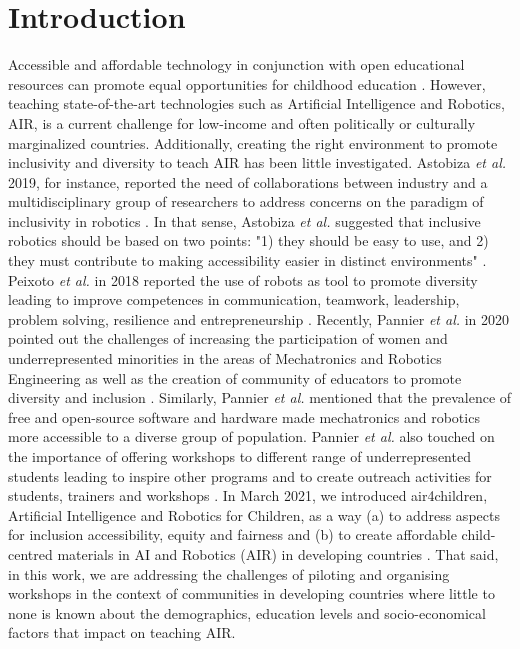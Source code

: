 \documentclass[conference]{IEEEtran}
\newcommand{\etal}{\textit{et al. }} %
\begin{document}
\section{Introduction}
Accessible and affordable technology in conjunction with open educational resources can promote equal opportunities for childhood education \cite{yoshie2021-unesco}.
However, teaching state-of-the-art technologies such as Artificial Intelligence and Robotics, AIR, is a current challenge for low-income and often politically or culturally marginalized countries.
Additionally, creating the right environment to promote inclusivity and diversity to teach AIR has been little investigated. 
Astobiza \etal 2019, for instance, reported the need of collaborations between industry and a multidisciplinary group of researchers to address concerns on the paradigm of inclusivity in robotics \cite{MonasterioAstobiza2019}.
In that sense, Astobiza \etal suggested that inclusive robotics should be based on two points: "1) they should be easy to use, and 2) they must contribute to making accessibility easier in distinct environments" \cite{MonasterioAstobiza2019}.
Peixoto \etal in 2018 reported the use of robots as tool to promote diversity leading to improve competences in communication, teamwork, leadership, problem solving, resilience and entrepreneurship \cite{PeixotoCastro2018, PeixotoGonzalez2018}. 
Recently, Pannier \etal in 2020 pointed out the challenges of increasing the  participation of women and underrepresented minorities in the areas of Mechatronics and Robotics Engineering as well as the creation of community of educators to promote diversity and inclusion \cite{Pannier2020}.
Similarly, Pannier \etal mentioned that the prevalence of free and open-source software and hardware made mechatronics and robotics more accessible to a diverse group of population.
Pannier \etal also touched on the importance of offering workshops to different range of underrepresented students leading to inspire other programs and to create outreach activities for students, trainers and workshops \cite{Pannier2020}.
In March 2021, we introduced air4children, Artificial Intelligence and Robotics for Children, as a way (a) to address aspects for inclusion accessibility, equity and fairness and (b) to create affordable child-centred materials in AI and Robotics (AIR) in developing countries \cite{montenegro2021air4children}. 
That said, in this work, we are addressing the challenges of piloting and organising workshops in the context of communities in developing countries where little to none is known about the demographics, education levels and socio-economical factors that impact on teaching AIR.  
\end{document}
